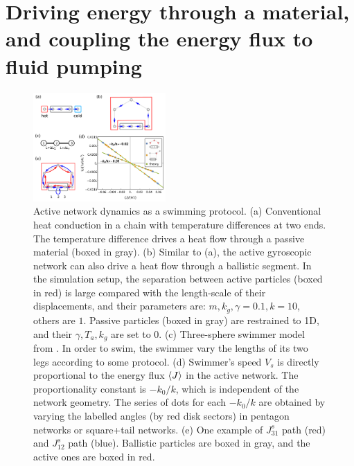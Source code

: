 \documentclass[
 preprint,
 preprintnumbers,
 amsmath,amssymb,
 aps,
 pre,
 longbibliography,
 superscriptaddress,
 10pt, twocolumn
]{revtex4-1}
\begin{document}


\section{Driving energy through a material, and coupling the energy flux to fluid pumping} \label{sec:swimmer}

\begin{figure}[ht]
	\centering
	\includegraphics[width=0.45\textwidth]{7_swimmer.pdf}
    \caption{Active network dynamics as a swimming protocol.
    (a) Conventional heat conduction in a chain with temperature differences at two ends. The temperature difference drives a heat flow through a passive material (boxed in gray).
    (b) Similar to (a), the active gyroscopic network can also drive a heat flow through a ballistic segment. In the simulation setup, the separation between active particles (boxed in red) is large compared with the length-scale of their displacements, and their parameters are: $m,k_g,\gamma=0.1, k=10$, others are $1$. Passive particles (boxed in gray) are restrained to 1D, and their $\gamma,T_a,k_g$ are set to $0$.
    (c) Three-sphere swimmer model from \cite{Golestanian2008AnalyticResults}. In order to swim, the swimmer vary the lengths of its two legs according to some protocol.
    (d) Swimmer's speed $V_s$ is directly proportional to the energy flux $\expval{J}$ in the active network. The proportionality constant is $-k_0/k$, which is independent of the network geometry. The series of dots for each $-k_0/k$ are obtained by varying the labelled angles (by red disk sectors) in pentagon networks or square+tail networks.
    (e) One example of $J_{31}^s$ path (red) and $J_{12}^s$ path (blue). Ballistic particles are boxed in gray, and the active ones are boxed in red.
    }
    \label{fig:swimmer}
\end{figure}
\end{document}
